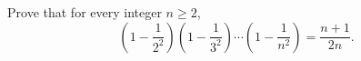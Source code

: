 Prove that for every integer $n\ge2$,
\[\left(1-\dfrac1{2^2}\right)\left(1-\dfrac1{3^2}\right)\cdots\left(1-\dfrac1{n^2}\right)=\dfrac{n+1}{2n}.\]
